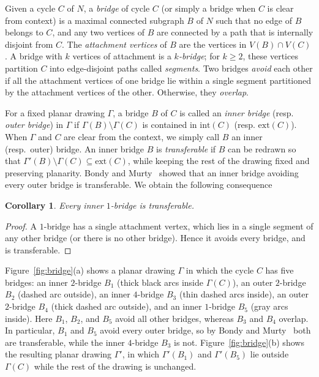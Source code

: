 \documentclass[pdflatex,sn-mathphys-num]{sn-jnl}
\theoremstyle{thmstyleone}%
\theoremstyle{thmstyletwo}%
\newtheorem{corollary}{Corollary}
\theoremstyle{thmstylethree}%
\begin{document}
Given a cycle $C$ of $N$, a \emph{bridge} of cycle $C$ (or simply a bridge when $C$ is clear from context) is a maximal connected subgraph $B$ of $N$ such that no edge of $B$ belongs to $C$, and any two vertices of $B$ are connected by a path that is internally disjoint from $C$. The \emph{attachment vertices} of $B$ are the vertices in $V(B) \cap V(C)$. A bridge with $k$ vertices of attachment is a \emph{$k$-bridge}; for $k\ge 2$, these vertices partition $C$ into edge-disjoint paths called \emph{segments}.
Two bridges \emph{avoid} each other if all the attachment vertices of one bridge lie within a single segment partitioned by the attachment vertices of the other. Otherwise, they \emph{overlap}.




For a fixed planar drawing $\Gamma$, a bridge $B$ of $C$ is called an \emph{inner bridge} (resp. \emph{outer bridge}) in $\Gamma$ if $\Gamma(B)\setminus \Gamma(C)$ is contained in $\mathrm{int}(C)$ (resp. $\mathrm{ext}(C)$). When $\Gamma$ and $C$ are clear from the context, we simply call $B$ an inner (resp.\ outer) bridge. An inner bridge $B$ is \emph{transferable} if $B$ can be redrawn so that $\Gamma'(B)\setminus\Gamma(C)\subseteq \mathrm{ext}(C)$, while keeping the rest of the drawing fixed and preserving planarity. Bondy and Murty~\cite[Thm.~9.9]{BoMu} showed that an inner bridge avoiding every outer bridge is transferable. We obtain the following consequence

\begin{corollary}\label{cor:inner1bridge}
Every inner $1$-bridge is transferable.
\end{corollary}

\begin{proof}
A $1$-bridge has a single attachment vertex, which  lies in a single segment of any other bridge (or there is no other bridge). Hence it avoids every bridge, and is transferable.
\end{proof}

Figure~\ref{fig:bridge}(a) shows a planar drawing $\Gamma$ in which the cycle $C$ 
has five bridges: an inner $2$-bridge $B_1$ (thick black arcs inside $\Gamma(C)$), an outer $2$-bridge $B_2$ (dashed arc outside), an inner $4$-bridge $B_3$ (thin dashed arcs inside), an outer $2$-bridge $B_4$ (thick dashed arc outside), and an inner $1$-bridge $B_5$ (gray arcs inside). Here $B_1$, $B_2$, and $B_5$ avoid all other bridges, whereas $B_3$ and $B_4$ overlap. In particular, $B_1$ and $B_5$ avoid every outer bridge, so by Bondy and Murty~\cite[Thm.~9.9]{BoMu} both are transferable, while the inner $4$-bridge $B_3$ is not. Figure~\ref{fig:bridge}(b) shows the resulting planar drawing $\Gamma'$, in which $\Gamma'(B_1)$ and $\Gamma'(B_5)$ lie outside $\Gamma(C)$ while the rest of the drawing is unchanged.
\end{document}
